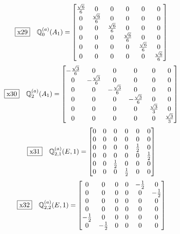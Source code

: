 \documentclass[fleqn,10pt,landscape]{jsarticle}
\begin{document}
\begin{dmath*}
\fbox{x29}\quad \mathbb{Q}_{0}^{(a)}(A_{1})=\begin{bmatrix} \frac{\sqrt{6}}{6} & 0 & 0 & 0 & 0 & 0 \\ 0 & \frac{\sqrt{6}}{6} & 0 & 0 & 0 & 0 \\ 0 & 0 & \frac{\sqrt{6}}{6} & 0 & 0 & 0 \\ 0 & 0 & 0 & \frac{\sqrt{6}}{6} & 0 & 0 \\ 0 & 0 & 0 & 0 & \frac{\sqrt{6}}{6} & 0 \\ 0 & 0 & 0 & 0 & 0 & \frac{\sqrt{6}}{6} \end{bmatrix}
\end{dmath*}
\begin{dmath*}
\fbox{x30}\quad \mathbb{Q}_{2}^{(a)}(A_{1})=\begin{bmatrix} - \frac{\sqrt{3}}{6} & 0 & 0 & 0 & 0 & 0 \\ 0 & - \frac{\sqrt{3}}{6} & 0 & 0 & 0 & 0 \\ 0 & 0 & - \frac{\sqrt{3}}{6} & 0 & 0 & 0 \\ 0 & 0 & 0 & - \frac{\sqrt{3}}{6} & 0 & 0 \\ 0 & 0 & 0 & 0 & \frac{\sqrt{3}}{3} & 0 \\ 0 & 0 & 0 & 0 & 0 & \frac{\sqrt{3}}{3} \end{bmatrix}
\end{dmath*}
\begin{dmath*}
\fbox{x31}\quad \mathbb{Q}_{2,1}^{(a)}(E,1)=\begin{bmatrix} 0 & 0 & 0 & 0 & 0 & 0 \\ 0 & 0 & 0 & 0 & 0 & 0 \\ 0 & 0 & 0 & 0 & \frac{1}{2} & 0 \\ 0 & 0 & 0 & 0 & 0 & \frac{1}{2} \\ 0 & 0 & \frac{1}{2} & 0 & 0 & 0 \\ 0 & 0 & 0 & \frac{1}{2} & 0 & 0 \end{bmatrix}
\end{dmath*}
\begin{dmath*}
\fbox{x32}\quad \mathbb{Q}_{2,2}^{(a)}(E,1)=\begin{bmatrix} 0 & 0 & 0 & 0 & - \frac{1}{2} & 0 \\ 0 & 0 & 0 & 0 & 0 & - \frac{1}{2} \\ 0 & 0 & 0 & 0 & 0 & 0 \\ 0 & 0 & 0 & 0 & 0 & 0 \\ - \frac{1}{2} & 0 & 0 & 0 & 0 & 0 \\ 0 & - \frac{1}{2} & 0 & 0 & 0 & 0 \end{bmatrix}
\end{dmath*}
\end{document}
